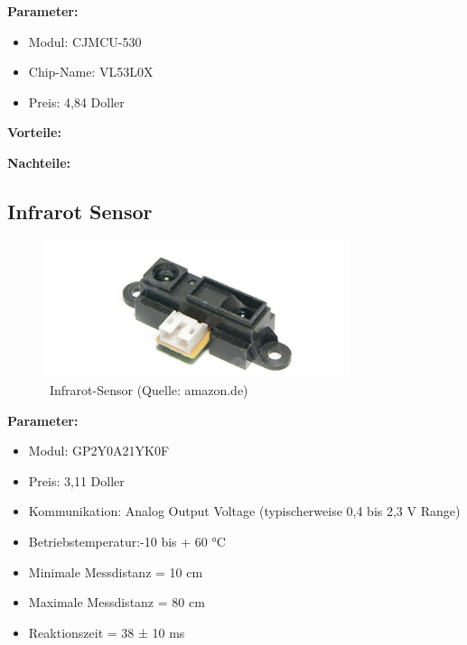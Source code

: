 \textbf{Parameter:}  %

\begin{itemize}
\item Modul: CJMCU-530
\item Chip-Name: VL53L0X
\item Preis: 4,84 Doller
\end{itemize}

\par\bigskip %
\textbf{Vorteile:}  %

\par\bigskip %
\textbf{Nachteile:}  %

\subsection{Infrarot Sensor}

\begin{figure}[ht]  %
	\centering\includegraphics[width=0.8\textwidth]{images/infrarot.png}
	\caption{ \ Infrarot-Sensor  (Quelle: amazon.de)}
	\label{infrarot} %
\end{figure}

\textbf{Parameter:}  %

\begin{itemize}
\item Modul: GP2Y0A21YK0F
\item Preis: 3,11 Doller
\item Kommunikation: Analog Output Voltage (typischerweise 0,4 bis 2,3 V Range)
\item Betriebstemperatur:-10 bis + 60 °C
\item Minimale Messdistanz = 10 cm
\item Maximale Messdistanz = 80 cm
\item Reaktionszeit = 38 ± 10 ms
\end{itemize}


